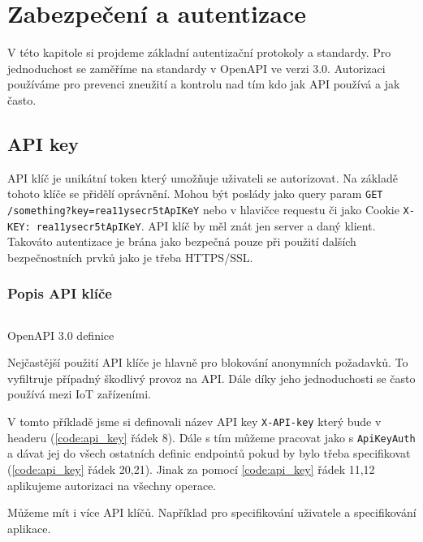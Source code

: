 \chapter{Zabezpečení a autentizace}
V této kapitole si projdeme základní autentizační protokoly a standardy.
Pro jednoduchost se zaměříme na standardy v OpenAPI ve verzi 3.0.
Autorizaci používáme pro prevenci zneužití a kontrolu nad tím kdo jak API používá a jak často.

\section{API key}
API klíč je unikátní token který umožňuje uživateli se autorizovat. Na základě tohoto klíče se přidělí oprávnění. Mohou být poslády jako query param  \texttt{GET /something?key=rea11ysecr5tApIKeY} nebo v hlavičce requestu či jako Cookie \texttt{X-KEY: rea11ysecr5tApIKeY}. API klíč by měl znát jen server a daný klient. Takováto autentizace je brána jako bezpečná pouze při použití dalších bezpečnostních prvků jako je třeba HTTPS/SSL.

\subsection{Popis API klíče}
\begin{listing}[ht]
    \inputminted[]{yaml}{resources/code/security/openapi-key.yml}
    \caption{OpenAPI 3.0 definice}
    \label{code:api_key}
\end{listing}

Nejčastější použití API klíče je hlavně pro blokování anonymních požadavků. To vyfiltruje případný škodlivý provoz na API. Dále díky jeho jednoduchosti se často používá mezi IoT zařízeními.

V tomto příkladě jsme si definovali název API key \texttt{X-API-key} který bude v headeru (\ref{code:api_key} řádek 8). Dále s tím můžeme pracovat jako s \texttt{ApiKeyAuth} a dávat jej do všech ostatních definic endpointů pokud by bylo třeba specifikovat (\ref{code:api_key} řádek 20,21). Jinak za pomocí \ref{code:api_key} řádek 11,12 aplikujeme autorizaci na všechny operace.


Můžeme mít i více API klíčů. Například pro specifikování uživatele a specifikování aplikace.

